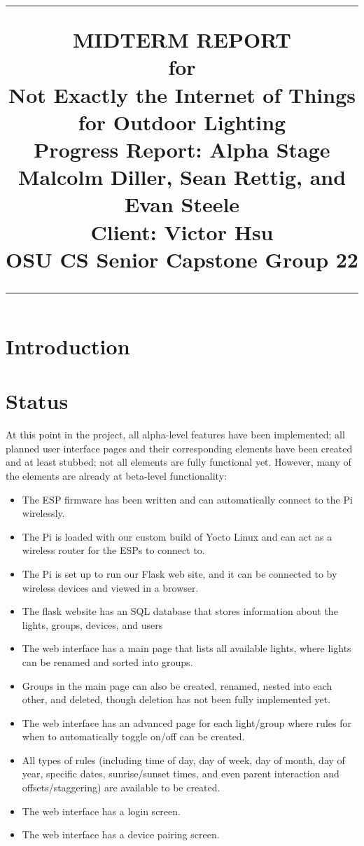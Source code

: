 \documentclass[oneside,openright]{book}
\title{
	\flushright
		\rule{16cm}{5pt}\vskip1cm
		\Huge{MIDTERM REPORT}\\
	for\\
		\vspace{2cm}
	Not Exactly the Internet of Things for Outdoor Lighting\\
		\vspace{2cm}
	\LARGE{Progress Report:}
	\vspace{2cm}
	\LARGE{Alpha Stage\\}
	\vspace{2cm}
	Malcolm Diller, Sean Rettig, and Evan Steele\\
        Client: Victor Hsu\\
        OSU CS Senior Capstone Group 22
		\vfill
		\rule{16cm}{5pt}
}
\date{}
\begin{document}
\maketitle
\tableofcontents
\newpage
{}
\section{Introduction}

\section{Status}

At this point in the project, all alpha-level features have been implemented;
all planned user interface pages and their corresponding elements have been
created and at least stubbed; not all elements are fully functional yet.
However, many of the elements are already at beta-level functionality:

\begin{itemize}
    \item The ESP firmware has been written and can automatically connect to
        the Pi wirelessly.
    \item The Pi is loaded with our custom build of Yocto Linux and can act as
        a wireless router for the ESPs to connect to.
    \item The Pi is set up to run our Flask web site, and it can be connected 
        to by wireless devices and viewed in a browser.
    \item The flask website has an SQL database that stores information about 
        the lights, groups, devices, and users
    \item The web interface has a main page that lists all available lights,
        where lights can be renamed and sorted into groups.
    \item Groups in the main page can also be created, renamed, nested into 
        each other, and deleted, though deletion has not been fully implemented yet.
    \item The web interface has an advanced page for each light/group where
        rules for when to automatically toggle on/off can be created.
    \item All types of rules (including time of day, day of week, day of month,
        day of year, specific dates, sunrise/sunset times, and even parent
        interaction and offsets/staggering) are available to be created.
    \item The web interface has a login screen.
    \item The web interface has a device pairing screen.
\end{itemize}
\end{document}
